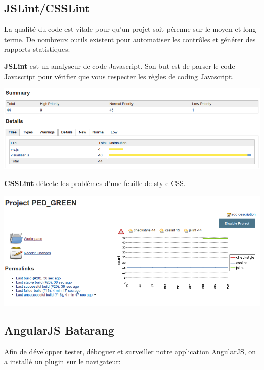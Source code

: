 \documentclass [a4paper,11pt]{article}
\begin{document}
\subsection{JSLint/CSSLint}

La qualité du code est vitale pour qu'un projet soit pérenne sur le moyen et long terme. De nombreux outils existent pour automatiser les contrôles et générer des rapports statistiques:\newline

\textbf{JSLint} est un analyseur de code Javascript. Son but est de parser le code Javascript pour vérifier que vous respecter les règles de coding Javascript.\newline

\begin{center}
\includegraphics[scale=0.4]{img/checkstyle.png}
\end{center}

\textbf{CSSLint} détecte les problèmes d'une feuille de style CSS.

\begin{center}
\includegraphics[scale=0.4]{img/jslint.png}
\end{center}

\subsection{AngularJS Batarang}

Afin de développer tester, déboguer et surveiller notre application AngularJS, on a installé un plugin sur le navigateur:\newline
\end{document}

